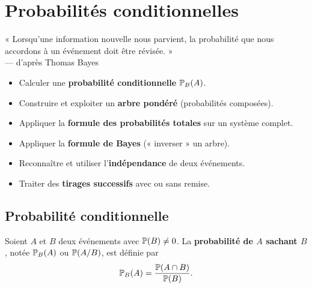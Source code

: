 \chapter{Probabilités conditionnelles}

\begin{citationchapitre}
	« Lorsqu'une information nouvelle nous parvient, la probabilité que nous
	accordons à un événement doit être révisée. »\\[0.4em]
	— d'après Thomas Bayes
\end{citationchapitre}

\begin{objectifs}
	\begin{itemize}[label=\textbullet]
		\item Calculer une \textbf{probabilité conditionnelle} $\mathbb{P}_B(A)$.
		\item Construire et exploiter un \textbf{arbre pondéré}
		(probabilités composées).
		\item Appliquer la \textbf{formule des probabilités totales} sur un
		système complet.
		\item Appliquer la \textbf{formule de Bayes} (« inverser » un arbre).
		\item Reconnaître et utiliser l'\textbf{indépendance} de deux
		événements.
		\item Traiter des \textbf{tirages successifs} avec ou sans remise.
	\end{itemize}
\end{objectifs}


\section{Probabilité conditionnelle}

\begin{definition}
	Soient $A$ et $B$ deux événements avec $\mathbb{P}(B) \neq 0$. La
	\textbf{probabilité de $A$ sachant $B$}, notée $\mathbb{P}_B(A)$ ou
	$\mathbb{P}(A/B)$, est définie par
	\[
	\mathbb{P}_B(A) = \frac{\mathbb{P}(A\cap B)}{\mathbb{P}(B)}.
	\]
\end{definition}


